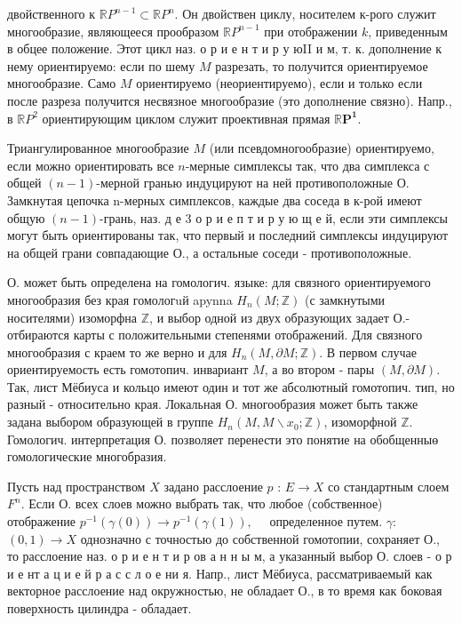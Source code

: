 \documentclass[10pt]{article}
\begin{document}
двойственного к $\mathbb{R} P^{n-1} \subset \mathbb{R} P^{n}$. Он двойствен циклу, носителем к-рого служит многообразие, являющееся прообразом $\mathbb{R} P^{n-1}$ при отображении $k$, приведенным в обцее положение. Этот цикл наз. о р и е н т и р у юII и м, т. к. дополнение к нему ориентируемо: если по шему $M$ разрезать, то получится ориентируемое многообразие. Само $M$ ориентируемо (неориентируемо), если и только если после разреза получится несвязное многообразие (это дополнение связно). Напр., в $\mathbb{R} P^{2}$ ориентирующим циклом служит проективная прямая $\mathbb{R} \boldsymbol{P}^{\mathbf{1}}$.



Триангулированное многообразие $M$ (или псевдомногообразие) ориентируемо, если можно ориентировать все $n$-мерные симплексы так, что два симплекса с общей $(n-1)$-мерной гранью индуцируют на ней противоположные О. Замкнутая цепочка n-мерных симплексов, каждые два соседа в к-рой имеют общую $(n-1)$-грань, наз. д е 3 о р и е п т и р у ю щ е й, если эти симплексы могут быть ориентированы так, что первый и последний симплексы индуцируют на общей грани совпадающие О., а остальные соседи - противоположные.



О. может быть определена на гомологич. языке: для связного ориентируемого многообразия без края гомологuй apynna $H_{n}(M ; \mathbb{Z})$ (с замкнутыми носителями) изоморфна $\mathbb{Z}$, и выбор одной из двух образующих задает О.- отбираются карты с положительными степенями отображений. Для связного многообразия с краем то же верно и для $H_{n}(M, \partial M ; \mathbb{Z})$. В первом случае ориентируемость есть гомотопич. инвариант $M$, а во втором - пары $(M, \partial M)$. Так, лист Мёбиуса и кольцо имеют один и тот же абсолютный гомотопич. тип, но разный - относительно края. Локальная О. многообразия может быть также задана выбором образующей в группе $H_{n}\left(M, M \backslash x_{0} ; \mathbb{Z}\right)$, изоморфной $\mathbb{Z}$. Гомологич. интерпретация $О$. позволяет перенести это понятие на обобщенныө гомологические многобразия.



Пусть над пространством $X$ задано расслоение $p$ : $E \rightarrow X$ со стандартным слоем $F^{n}$. Если О. всех слоев можно выбрать так, что любое (собственное) отображение $p^{-1}(\gamma(0)) \rightarrow p^{-1}(\gamma(1)), \quad$ определенное путем. $\gamma:$ $(0,1) \rightarrow X$ однозначно с точностью до собственной гомотопии, сохраняет О., то расслоение наз. о р и е н т и р ов а н н ы м, а указанный выбор О. слоев - о р и е нт а ц и е й р а с с л о е ни я. Напр., лист Мёбиуса, рассматриваемый как векторное расслоение над окружностью, не обладает О., в то время как боковая поверхность цилиндра - обладает.
\end{document}
